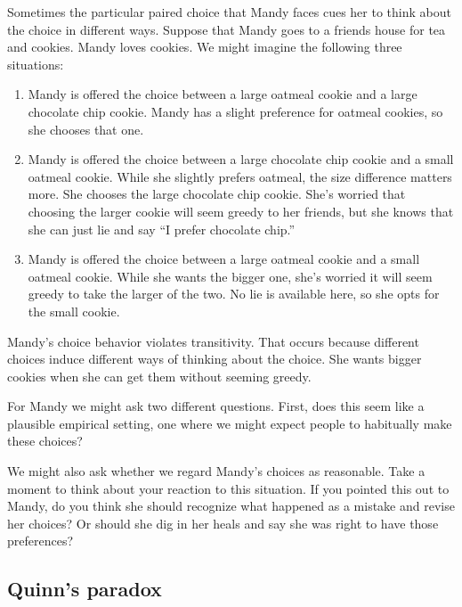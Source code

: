  Sometimes the particular paired choice that Mandy faces cues her to think about the choice in different ways. Suppose that Mandy goes to a friends house for tea and cookies.  Mandy loves cookies. We might imagine the following three situations:
\begin{enumerate}
    \item Mandy is offered the choice between a large oatmeal cookie and a large chocolate chip cookie. Mandy has a slight preference for oatmeal cookies, so she chooses that one.
    \item Mandy is offered the choice between a large chocolate chip cookie and a small oatmeal cookie. While she slightly prefers oatmeal, the size difference matters more. She chooses the large chocolate chip cookie. She's worried that choosing the larger cookie will seem greedy to her friends, but she knows that she can just lie and say ``I prefer chocolate chip.''
    \item Mandy is offered the choice between a large oatmeal cookie and a small oatmeal cookie. While she wants the bigger one, she's worried it will seem greedy to take the larger of the two. No lie is available here, so she opts for the small cookie.
\end{enumerate}

Mandy's choice behavior violates transitivity. That occurs because different choices induce different ways of thinking about the choice. She wants bigger cookies when she can get them without seeming greedy. 

For Mandy we might ask two different questions.  First, does this seem like a plausible empirical setting, one where we might expect people to habitually make these choices? 

We might also ask whether we regard Mandy's choices as reasonable. Take a moment to think about your reaction to this situation.  If you pointed this out to Mandy, do you think she should recognize what happened as a mistake and revise her choices?  Or should she dig in her heals and say she was right to have those preferences?

\subsection{Quinn's paradox}

